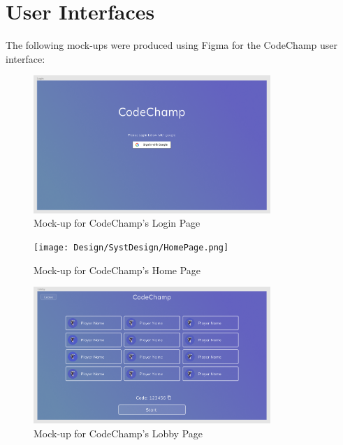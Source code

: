 \documentclass[12pt, titlepage]{article}
\begin{document}

\section{User Interfaces}

The following mock-ups were produced using Figma for the CodeChamp user interface: 

\begin{figure}[H]
\centering
\includegraphics[width=0.8\textwidth]{Design/SystDesign/LoginPage.png}
\caption{Mock-up for CodeChamp's Login Page}
\end{figure}

\begin{figure}[H]
\centering
\texttt{[image: Design/SystDesign/HomePage.png]}
\caption{Mock-up for CodeChamp's Home Page}
\end{figure}

\begin{figure}[H]
\centering
\includegraphics[width=0.8\textwidth]{Design/SystDesign/LobbyPage.png}
\caption{Mock-up for CodeChamp's Lobby Page}
\end{figure}
\end{document}
